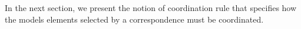 In the next section, we present the notion of coordination rule that specifies how the models elements selected by a correspondence must be coordinated.     
	
	
					



	
	
	
	
	
	
	
				